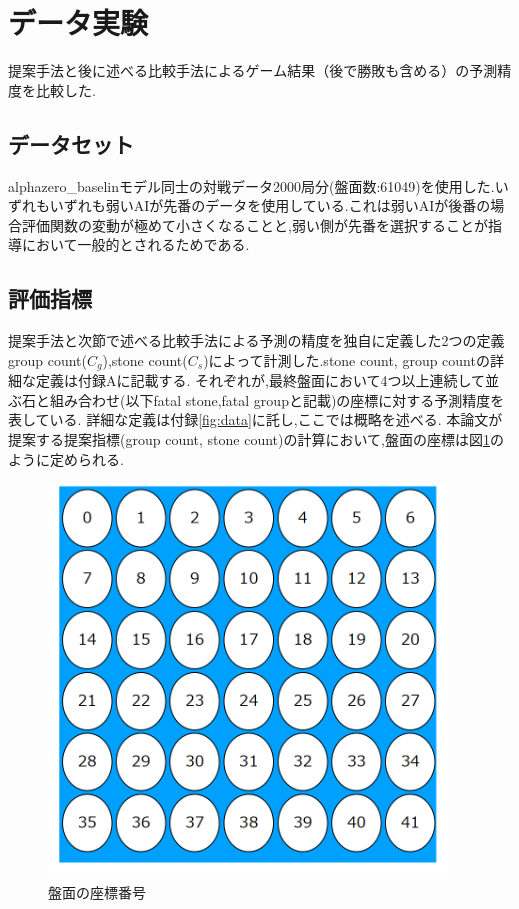 \section{データ実験}
\label{chap:evaluation}
提案手法と後に述べる比較手法によるゲーム結果（後で勝敗も含める）の予測精度を比較した.
\subsection{データセット}
alphazero\_baselinモデル同士の対戦データ2000局分(盤面数:61049)を使用した.いずれもいずれも弱いAIが先番のデータを使用している.これは弱いAIが後番の場合評価関数の変動が極めて小さくなることと,弱い側が先番を選択することが指導において一般的とされるためである.



\subsection{評価指標}
提案手法と次節で述べる比較手法による予測の精度を独自に定義した2つの定義group count($C_g$),stone count($C_s$)によって計測した.stone count, group countの詳細な定義は付録Aに記載する.
それぞれが,最終盤面において4つ以上連続して並ぶ石と組み合わせ(以下fatal stone,fatal groupと記載)の座標に対する予測精度を表している.
詳細な定義は付録\ref{fig:data}に託し,ここでは概略を述べる.
本論文が提案する提案指標(group count, stone count)の計算において,盤面の座標は図\ref{fig:index}のように定められる.
\begin{figure}[t]
	\centering
	\includegraphics[width=300pt]{./figure/index.png}
	\caption{盤面の座標番号}
	\label{fig:index}
\end{figure}
